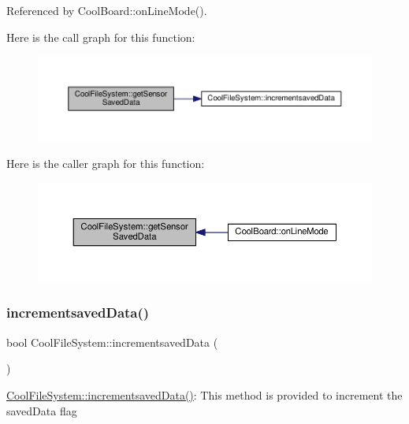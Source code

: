 Referenced by Cool\+Board\+::on\+Line\+Mode().

Here is the call graph for this function\+:
\nopagebreak
\begin{figure}[H]
\begin{center}
\leavevmode
\includegraphics[width=350pt]{db/d0c/class_cool_file_system_a3223ffff4266a6300988fab956d6b4b2_cgraph}
\end{center}
\end{figure}
Here is the caller graph for this function\+:
\nopagebreak
\begin{figure}[H]
\begin{center}
\leavevmode
\includegraphics[width=350pt]{db/d0c/class_cool_file_system_a3223ffff4266a6300988fab956d6b4b2_icgraph}
\end{center}
\end{figure}
\mbox{\label{class_cool_file_system_aae045125288f255f3e258073dcada2a6}} 
\subsubsection{\texorpdfstring{incrementsaved\+Data()}{incrementsavedData()}}
{\footnotesize\ttfamily bool Cool\+File\+System\+::incrementsaved\+Data (\begin{DoxyParamCaption}{ }\end{DoxyParamCaption})}

\hyperlink{class_cool_file_system_aae045125288f255f3e258073dcada2a6}{Cool\+File\+System\+::incrementsaved\+Data()}\+: This method is provided to increment the saved\+Data flag

